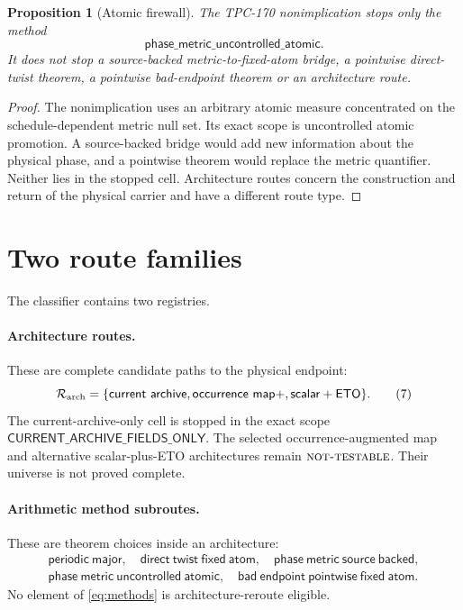 \documentclass[11pt]{article}
\newtheorem{proposition}[theorem]{Proposition}
\theoremstyle{definition}
\theoremstyle{remark}
\newcommand{\NT}{\textnormal{\textsc{not-testable}}}
\begin{document}
\begin{proposition}[Atomic firewall]
\label{prop:atomic}
The TPC-170 nonimplication stops only the method
\[
 \mathsf{phase\_metric\_uncontrolled\_atomic}.
\tag{6}\label{eq:atomic-stop}
\]
It does not stop a source-backed metric-to-fixed-atom bridge, a
pointwise direct-twist theorem, a pointwise bad-endpoint theorem or an
architecture route.
\end{proposition}

\begin{proof}
The nonimplication uses an arbitrary atomic measure concentrated on
the schedule-dependent metric null set.  Its exact scope is
uncontrolled atomic promotion.  A source-backed bridge would add new
information about the physical phase, and a pointwise theorem would
replace the metric quantifier.  Neither lies in the stopped cell.
Architecture routes concern the construction and return of the
physical carrier and have a different route type.
\end{proof}

\section{Two route families}

The classifier contains two registries.

\paragraph{Architecture routes.}
These are complete candidate paths to the physical endpoint:
\[
\mathcal R_{\rm arch}
=\{\mathsf{current\ archive},\mathsf{occurrence\ map+},
    \mathsf{scalar+ETO}\}.
\tag{7}\label{eq:arch}
\]
The current-archive-only cell is stopped in the exact scope
\(\mathsf{CURRENT\_ARCHIVE\_FIELDS\_ONLY}\).  The selected
occurrence-augmented map and alternative scalar-plus-ETO architectures
remain \(\NT\).  Their universe is not proved complete.

\paragraph{Arithmetic method subroutes.}
These are theorem choices inside an architecture:
\[
\begin{gathered}
\mathsf{periodic\ major},\quad
\mathsf{direct\ twist\ fixed\ atom},\quad
\mathsf{phase\ metric\ source\ backed},\\
\mathsf{phase\ metric\ uncontrolled\ atomic},\quad
\mathsf{bad\ endpoint\ pointwise\ fixed\ atom}.
\end{gathered}
\tag{8}\label{eq:methods}
\]
No element of \eqref{eq:methods} is architecture-reroute eligible.
\end{document}
